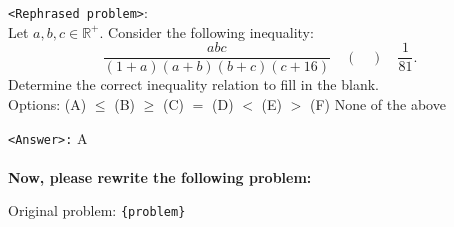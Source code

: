 \begin{textcolorbox}
\vspace{2mm}
\texttt{<Rephrased problem>}: \\
Let $a, b, c \in \mathbb{R}^{+}$. Consider the following inequality:
$$
\frac{a b c}{(1+a)(a+b)(b+c)(c+16)} \quad (\quad) \quad \frac{1}{81} .
$$
Determine the correct inequality relation to fill in the blank. 
\\
Options:
(A) $\leq$ \quad
(B) $\geq$\quad
(C) $=$ \quad
(D) $<$ \quad
(E) $>$ \quad
(F) None of the above

\vspace{2mm}
\texttt{<Answer>:} A
\\\\
\textbf{Now, please rewrite the following problem:}

Original problem: \texttt{\{problem\}}
\end{textcolorbox}